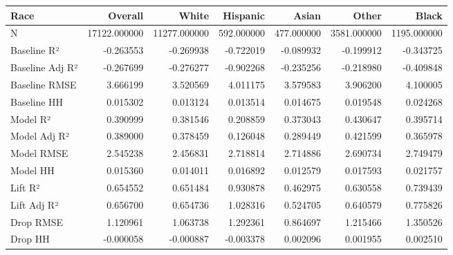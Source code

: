\begin{tabular}{lrrrrrr}
\toprule
Race &       Overall &         White &    Hispanic &       Asian &        Other &        Black \\
\midrule
N               &  17122.000000 &  11277.000000 &  592.000000 &  477.000000 &  3581.000000 &  1195.000000 \\
Baseline R²     &     -0.263553 &     -0.269938 &   -0.722019 &   -0.089932 &    -0.199912 &    -0.343725 \\
Baseline Adj R² &     -0.267699 &     -0.276277 &   -0.902268 &   -0.235256 &    -0.218980 &    -0.409848 \\
Baseline RMSE   &      3.666199 &      3.520569 &    4.011175 &    3.579583 &     3.906200 &     4.100005 \\
Baseline HH     &      0.015302 &      0.013124 &    0.013514 &    0.014675 &     0.019548 &     0.024268 \\
Model R²        &      0.390999 &      0.381546 &    0.208859 &    0.373043 &     0.430647 &     0.395714 \\
Model Adj R²    &      0.389000 &      0.378459 &    0.126048 &    0.289449 &     0.421599 &     0.365978 \\
Model RMSE      &      2.545238 &      2.456831 &    2.718814 &    2.714886 &     2.690734 &     2.749479 \\
Model HH        &      0.015360 &      0.014011 &    0.016892 &    0.012579 &     0.017593 &     0.021757 \\
Lift R²         &      0.654552 &      0.651484 &    0.930878 &    0.462975 &     0.630558 &     0.739439 \\
Lift Adj R²     &      0.656700 &      0.654736 &    1.028316 &    0.524705 &     0.640579 &     0.775826 \\
Drop RMSE       &      1.120961 &      1.063738 &    1.292361 &    0.864697 &     1.215466 &     1.350526 \\
Drop HH         &     -0.000058 &     -0.000887 &   -0.003378 &    0.002096 &     0.001955 &     0.002510 \\
\bottomrule
\end{tabular}
